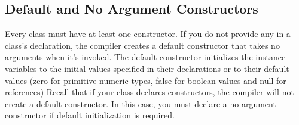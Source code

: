 \documentclass{report}
\begin{document}
    \pagebreak 
    \bigbreak \noindent 
    \subsection{Default and No Argument Constructors}
    \bigbreak \noindent 
    Every class must have at least one constructor. If you do not
    provide any in a class’s declaration, the compiler creates a
    default constructor that takes no arguments when it’s invoked.
    The default constructor initializes the instance variables to the
    initial values specified in their declarations or to their default
    values (zero for primitive numeric types, false for
    boolean values and null for references)
    \bigbreak \noindent 
    Recall that if your class declares constructors, the compiler
    will not create a default constructor. In this case, you must
    declare a no-argument constructor if default initialization is
    required.

    \bigbreak \noindent 
\end{document}
